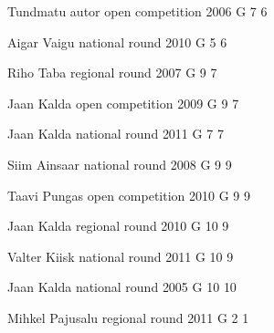\documentclass[11pt]{article}
\begin{document}
\ylDisplay{} %
{Tundmatu autor} %
{open competition} %
{2006} %
{G 7} %
{6} %
{

\ifEngSolution
\fi
}

\ylDisplay{} %
{Aigar Vaigu} %
{national round} %
{2010} %
{G 5} %
{6} %
{

\ifEngSolution
\fi
}

\ylDisplay{} %
{Riho Taba} %
{regional round} %
{2007} %
{G 9} %
{7} %
{

\ifEngSolution
\fi
}

\ylDisplay{} %
{Jaan Kalda} %
{open competition} %
{2009} %
{G 9} %
{7} %
{

\ifEngSolution
\fi
}

\ylDisplay{} %
{Jaan Kalda} %
{national round} %
{2011} %
{G 7} %
{7} %
{

\ifEngSolution
\fi
}

\ylDisplay{} %
{Siim Ainsaar} %
{national round} %
{2008} %
{G 9} %
{9} %
{

\ifEngSolution
\fi
}

\ylDisplay{} %
{Taavi Pungas} %
{open competition} %
{2010} %
{G 9} %
{9} %
{

\ifEngSolution
\fi
}

\ylDisplay{} %
{Jaan Kalda} %
{regional round} %
{2010} %
{G 10} %
{9} %
{

\ifEngSolution
\fi
}

\ylDisplay{} %
{Valter Kiisk} %
{national round} %
{2011} %
{G 10} %
{9} %
{

\ifEngSolution
\fi
}

\ylDisplay{} %
{Jaan Kalda} %
{national round} %
{2005} %
{G 10} %
{10} %
{

\ifEngSolution
\fi
}

\ylDisplay{} %
{Mihkel Pajusalu} %
{regional round} %
{2011} %
{G 2} %
{1} %
{

\ifEngSolution
\fi
}
\end{document}
